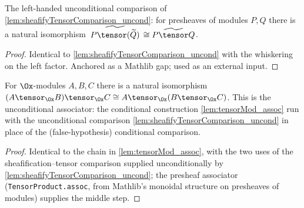 \begin{lemma}
  \label{lem:sheafifyTensorComparisonLeft_uncond}
  The left-handed unconditional comparison of \cref{lem:sheafifyTensorComparison_uncond}:
  for presheaves of modules $P, Q$ there is a natural isomorphism
  $\widetilde{\,P \tensor (\widetilde{Q})\,} \cong \widetilde{P \tensor Q}$.
  \begin{proof}
    Identical to \cref{lem:sheafifyTensorComparison_uncond} with the whiskering on the
    left factor. Anchored as a Mathlib gap; used as an external input.
  \end{proof}
\end{lemma}

\begin{lemma}

  \label{lem:tensorMod_assoc_uncond}
  For $\Ox$-modules $A, B, C$ there is a natural isomorphism
  $(A \tensor_{\Ox} B) \tensor_{\Ox} C \cong A \tensor_{\Ox} (B \tensor_{\Ox} C)$.
  This is the unconditional associator: the conditional construction
  \cref{lem:tensorMod_assoc} run with the unconditional comparison
  \cref{lem:sheafifyTensorComparison_uncond} in place of the (false-hypothesis)
  conditional comparison.
  \begin{proof}
    Identical to the chain in \cref{lem:tensorMod_assoc}, with the two uses of the
    sheafification--tensor comparison supplied unconditionally by
    \cref{lem:sheafifyTensorComparison_uncond}; the presheaf associator
    (\texttt{TensorProduct.assoc}, from Mathlib's monoidal structure on presheaves of
    modules) supplies the middle step.
  \end{proof}
\end{lemma}


